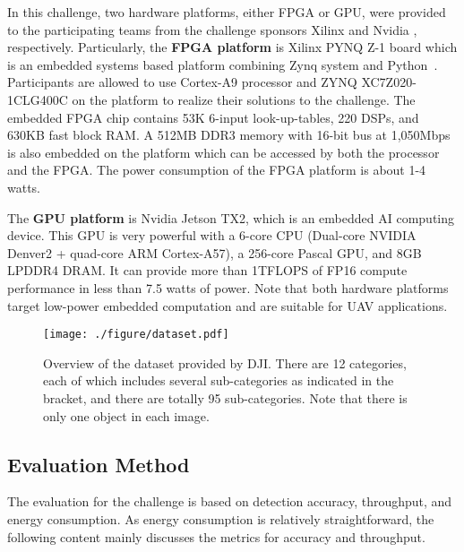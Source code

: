 \documentclass[10pt,journal,compsoc]{IEEEtran}
\begin{document}
In this challenge, two hardware platforms, either FPGA or GPU, were provided to the participating teams from the challenge sponsors Xilinx \cite{xilinx} and Nvidia \cite{nvidia}, respectively.
Particularly, the \textbf{FPGA platform} is Xilinx PYNQ Z-1 board which is an embedded systems based platform combining Zynq system and Python~\cite{janssen2017dynamic}.
Participants are allowed to use Cortex-A9 processor and ZYNQ XC7Z020-1CLG400C on the platform to realize their solutions to the challenge.
The embedded FPGA chip contains 53K 6-input look-up-tables, 220 DSPs, and 630KB fast block RAM.
A 512MB DDR3 memory with 16-bit bus at 1,050Mbps is also embedded on the platform which can be accessed by both the processor and the FPGA.
The power consumption of the FPGA platform is about 1-4 watts.

The \textbf{GPU platform} is Nvidia Jetson TX2, which is an embedded AI computing device.
This GPU is very powerful with a 6-core CPU (Dual-core NVIDIA Denver2 + quad-core ARM Cortex-A57), a 256-core Pascal GPU, and 8GB LPDDR4 DRAM.
It can provide more than 1TFLOPS of FP16 compute performance in less than 7.5 watts of power.
Note that both hardware platforms target low-power embedded computation and are suitable for UAV applications.

\begin{figure*}
  \texttt{[image: ./figure/dataset.pdf]}
  \vspace{-11pt}
  \caption{Overview of the dataset provided by DJI. There are 12 categories, each of which includes several sub-categories as indicated in the bracket, and there are totally 95 sub-categories. Note that there is only one object in each image.}
    \vspace{-1pt}
  \label{fig:dataset}
  \vspace{-16pt}
\end{figure*}

\subsection{Evaluation Method}

The evaluation for the challenge is based on detection accuracy, throughput, and energy consumption.
As energy consumption is relatively straightforward, the following content mainly discusses the metrics for accuracy and throughput.
\end{document}
